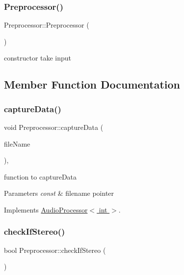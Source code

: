 \subsubsection{\texorpdfstring{Preprocessor()}{Preprocessor()}}
{\footnotesize\ttfamily Preprocessor\+::\+Preprocessor (\begin{DoxyParamCaption}\item[{int}]{ }\end{DoxyParamCaption})}

constructor take input 

\subsection{Member Function Documentation}
\mbox{\label{classPreprocessor_a0c44994af64474c46f442e9dcaabac05}} 
\subsubsection{\texorpdfstring{capture\+Data()}{captureData()}}
{\footnotesize\ttfamily void Preprocessor\+::capture\+Data (\begin{DoxyParamCaption}\item[{const std\+::string \&}]{file\+Name }\end{DoxyParamCaption})\hspace{0.3cm}{\ttfamily [override]}, {\ttfamily [virtual]}}

function to capture\+Data 
\begin{DoxyParams}{Parameters}
{\em const} & filename pointer \\
\hline
\end{DoxyParams}


Implements \hyperlink{classAudioProcessor_a0d6d6ef552e671405150d2cfbd4095c5}{Audio\+Processor$<$ int $>$}.

\mbox{\label{classPreprocessor_a5ddd30e7e8efc9d2ebdbfb355fb79c20}} 
\subsubsection{\texorpdfstring{check\+If\+Stereo()}{checkIfStereo()}}
{\footnotesize\ttfamily bool Preprocessor\+::check\+If\+Stereo (\begin{DoxyParamCaption}{ }\end{DoxyParamCaption})}

